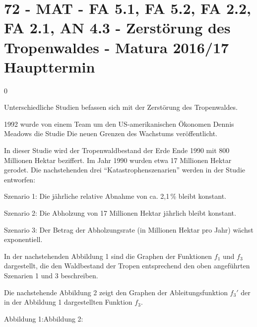 \section{72 - MAT - FA 5.1, FA 5.2, FA 2.2, FA 2.1, AN 4.3  - Zerstörung des Tropenwaldes - Matura 2016/17 Haupttermin}

\begin{langesbeispiel} \item[0] %
	
Unterschiedliche Studien befassen sich mit der Zerstörung des Tropenwaldes.\leer

1992 wurde von einem Team um den US-amerikanischen Ökonomen Dennis Meadows die Studie Die neuen Grenzen des Wachstums veröffentlicht.\leer

In dieser Studie wird der Tropenwaldbestand der Erde Ende 1990 mit 800 Millionen Hektar beziffert. Im Jahr 1990 wurden etwa 17 Millionen Hektar gerodet. Die nachstehenden drei "`Katastrophenszenarien"' werden in der Studie entworfen:\leer

Szenario 1: Die jährliche relative Abnahme von ca. 2,1\,\% bleibt konstant.

Szenario 2: Die Abholzung von 17 Millionen Hektar jährlich bleibt konstant.

Szenario 3: Der Betrag der Abholzungsrate (in Millionen Hektar pro Jahr) wächst exponentiell.\leer

In der nachstehenden Abbildung 1 sind die Graphen der Funktionen $f_1$ und $f_3$ dargestellt, die den Waldbestand der Tropen entsprechend den oben angeführten Szenarien 1 und 3 beschreiben.\leer

Die nachstehende Abbildung 2 zeigt den Graphen der Ableitungsfunktion $f_3'$ der in der Abbildung 1 dargestellten Funktion $f_3$.

Abbildung 1:\hspace{5.5cm}Abbildung 2:


\end{langesbeispiel}
